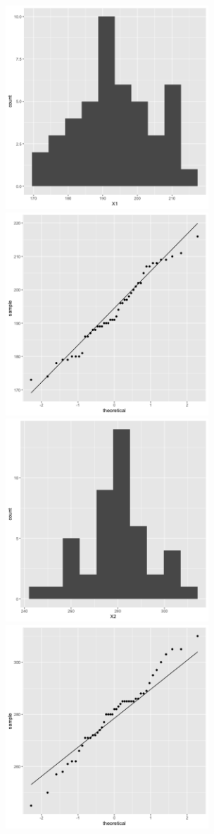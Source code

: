 \begin{enumerate}
	\begin{center}
		\includegraphics[width=3in]{plot_5_20_c_X1hist.png}
		\includegraphics[width=3in]{plot_5_20_c_X1qq.png}
		\includegraphics[width=3in]{plot_5_20_c_X2hist.png}
		\includegraphics[width=3in]{plot_5_20_c_X2qq.png}
	\end{center}


\end{enumerate}
